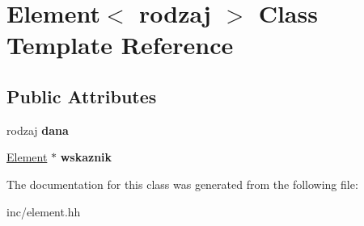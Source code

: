 \hypertarget{class_element}{\section{Element$<$ rodzaj $>$ Class Template Reference}
\label{class_element}
}
\subsection*{Public Attributes}
\begin{DoxyCompactItemize}
\item 
\hypertarget{class_element_a2d16a4b7f3fca0ac5b3ec1e1166663e3}{rodzaj {\bfseries dana}}\label{class_element_a2d16a4b7f3fca0ac5b3ec1e1166663e3}

\item 
\hypertarget{class_element_a8034874a00fdc2ed9b993cf313d065e7}{\hyperlink{class_element}{Element} $\ast$ {\bfseries wskaznik}}\label{class_element_a8034874a00fdc2ed9b993cf313d065e7}

\end{DoxyCompactItemize}


The documentation for this class was generated from the following file\-:\begin{DoxyCompactItemize}
\item 
inc/element.\-hh\end{DoxyCompactItemize}
